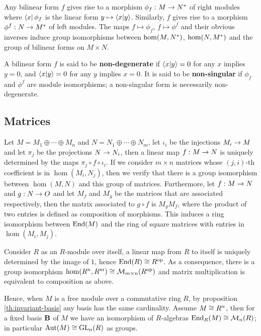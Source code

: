 Any bilinear form $f$ gives rise to a morphism $ \phi_f : M \rightarrow
N^\ast$ of right modules where $\left\langle x \right\rvert\phi_f$ is the linear form $y
\mapsto \left\langle x \middle| y \right\rangle$. Similarly, $f$ gives rise to a morphism
$\phi^f:N\rightarrow M^\ast$ of left modules. The maps $f\mapsto\phi_f$,
$f\mapsto\phi^f$ and their obvious inverses induce group isomorphisms
between $\hom(M,N^\ast)$, $\hom(N,M^\ast)$ and the group of
bilinear forms on $M\times N$.

A bilinear form $f$ is said to be
\textbf{non-degenerate} if
$\left\langle x \middle| y \right\rangle=0$ for any $x$ implies $y=0$, and $\left\langle x \middle| y \right\rangle=0$ for
any $y$ implies $x=0$. It is said to be
\textbf{non-singular} if $\phi_f$ and
$\phi^f$ are module isomorphisms; a non-singular form is necessarily
non-degenerate.


\subsection{Matrices}
\label{sec:linear-algebra:matrices}
Let $M=M_1\oplus\cdots\oplus M_n$ and $N=N_1\oplus\cdots\oplus N_m$,
let $\iota_i$ be the injections $M_i\rightarrow M$ and let $\pi_j$ be the
projections $N\rightarrow N_i$, then a linear map $f:M\rightarrow N$ is uniquely
determined by the maps $\pi_j\circ f\circ\iota_i$. If we consider
$m\times n$ matrices whose $(j,i)$-th coefficient is in
$\hom(M_i,N_j)$, then we verify that there is a group isomorphism
between $\hom(M,N)$ and this group of matrices. Furthermore, let
$f:M\rightarrow N$ and $g:N\rightarrow O$ and let $M_f$ and $M_g$ be the matrices that
are associated respectively, then the matrix associated to $g\circ f$
is $M_gM_f$, where the product of two entries is defined as
composition of morphisms. This induces a ring isomorphism between
$\operatorname{End}(M)$ and the ring of square matrices with entries in
$\hom(M_i,M_j)$.

Consider $R$ as an $R$-module over itself, a linear map from $R$ to
itself is uniquely determined by the image of $1$, hence $\operatorname{End}(R)\cong
R^{\mathrm{op}}$. As a consequence, there is a group isomorphism
$\hom(R^n,R^m)\cong\operatorname{\mathcal{M}}_{m\times n}(R^{\mathrm{op}})$ and matrix multiplication
is equivalent to composition as above.

Hence, when $M$ is a free module over a commutative ring $R$, by
proposition \ref{th:invariant-basis} any basis has the same
cardinality. Assume $M\cong R^n$, then for a fixed basis $\mathbf{B}$
of $M$ we have an isomorphism of $R$-algebras
$\operatorname{End}_R(M)\cong\operatorname{\mathcal{M}}_n(R)$; in particular $\operatorname{Aut}(M)\cong\operatorname{GL}_n(R)$ as
groups.

